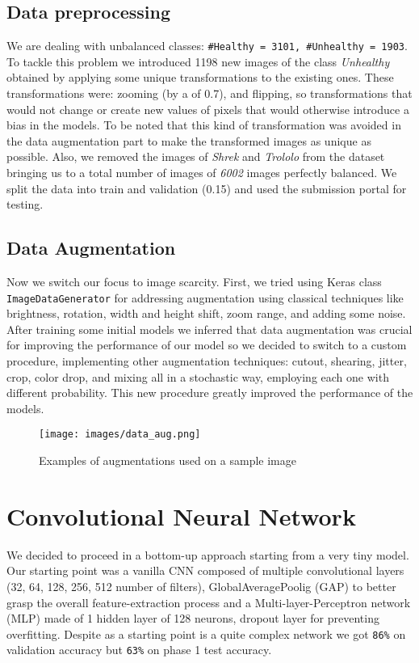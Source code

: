 \documentclass[conference,compsoc,11pt]{IEEEtran}
\begin{document}
\subsection{Data preprocessing}
We are dealing with unbalanced classes: \verb|#Healthy = 3101, #Unhealthy = 1903|.  To tackle this problem we introduced 1198 new images of the class \textit{Unhealthy} obtained by applying some unique transformations to the existing ones. These transformations were: zooming (by a of 0.7), and flipping, so transformations that would not change or create new values of pixels that would otherwise introduce a bias in the models. To be noted that this kind of transformation was avoided in the data augmentation part to make the transformed images as unique as possible. 
Also, we removed the images of  \textit{Shrek} and \textit{Trololo} from the dataset bringing us to a total number of images of \textit{6002} images perfectly balanced.
We split the data into train and validation (0.15) and used the submission portal for testing. 
\subsection{Data Augmentation}
Now we switch our focus to image scarcity. First, we tried using Keras class \verb|ImageDataGenerator| for addressing augmentation using classical techniques like brightness, rotation, width and height shift, zoom range, and adding some noise. After training some initial models we inferred that data augmentation was crucial for improving the performance of our model so we decided to switch to a custom procedure, implementing other augmentation techniques: cutout, shearing, jitter, crop, color drop, and mixing all in a stochastic way, employing each one with different probability.  This new procedure greatly improved the performance of the models. 
\\
\begin{figure}[htp]
    \centering
    \texttt{[image: images/data\_aug.png]}
    \caption{Examples of augmentations used on a sample image}
    \label{fig:aug_imgs}
\end{figure}


\section{Convolutional Neural Network}
We decided to proceed in a bottom-up approach starting from a very tiny model. Our starting point was a vanilla CNN composed of multiple convolutional layers (32, 64, 128, 256, 512 number of filters), GlobalAveragePoolig (GAP) to better grasp the overall feature-extraction process and a Multi-layer-Perceptron network (MLP) made of 1 hidden layer of 128 neurons, dropout layer for preventing overfitting. Despite as a starting point is a quite complex network we got \verb|86%| on validation accuracy but \verb|63%| on phase 1 test accuracy.
\end{document}

